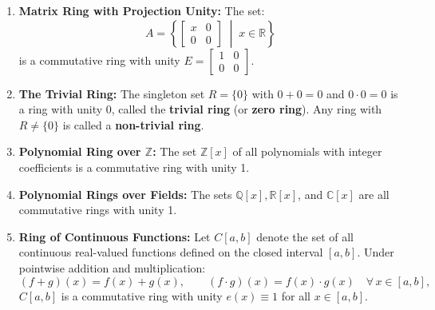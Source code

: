 \documentclass[11pt,a4paper]{article}
\begin{document}
\begin{enumerate}[label=\textbf{\arabic*)}]
\[    \]
    Furthermore, for any non-zero element $X = \begin{bmatrix} x & x \\ x & x \end{bmatrix}$ ($x \ne 0$), its multiplicative inverse $Y = \begin{bmatrix} y & y \\ y & y \end{bmatrix}$ satisfies:
    \[
    XY = E \implies 2xy = \frac{1}{2} \implies y = \frac{1}{4x} \implies Y = \begin{bmatrix} \frac{1}{4x} & \frac{1}{4x} \\[0.3em] \frac{1}{4x} & \frac{1}{4x} \end{bmatrix}.
    \]
    Thus $(A \setminus \{0\}, \cdot)$ is an abelian group, making $A$ a field!
    
    \item \textbf{Matrix Ring with Projection Unity:} The set:
    \[
    A = \left\{ \begin{bmatrix} x & 0 \\ 0 & 0 \end{bmatrix} \;\middle|\; x \in \mathbb{R} \right\}
    \]
    is a commutative ring with unity $E = \begin{bmatrix} 1 & 0 \\ 0 & 0 \end{bmatrix}$.
    
    \item \textbf{The Trivial Ring:} The singleton set $R = \{0\}$ with $0 + 0 = 0$ and $0 \cdot 0 = 0$ is a ring with unity $0$, called the \textbf{trivial ring} (or \textbf{zero ring}). Any ring with $R \ne \{0\}$ is called a \textbf{non-trivial ring}.
    
    \item \textbf{Polynomial Ring over $\mathbb{Z}$:} The set $\mathbb{Z}[x]$ of all polynomials with integer coefficients is a commutative ring with unity 1.
    
    \item \textbf{Polynomial Rings over Fields:} The sets $\mathbb{Q}[x], \mathbb{R}[x]$, and $\mathbb{C}[x]$ are all commutative rings with unity 1.
    
    \item \textbf{Ring of Continuous Functions:} Let $C[a, b]$ denote the set of all continuous real-valued functions defined on the closed interval $[a, b]$. Under pointwise addition and multiplication:
    \[
    (f + g)(x) = f(x) + g(x), \qquad (f \cdot g)(x) = f(x) \cdot g(x) \quad \forall\, x \in [a, b],
    \]
    $C[a, b]$ is a commutative ring with unity $e(x) \equiv 1$ for all $x \in [a, b]$.
\end{enumerate}
\end{document}
